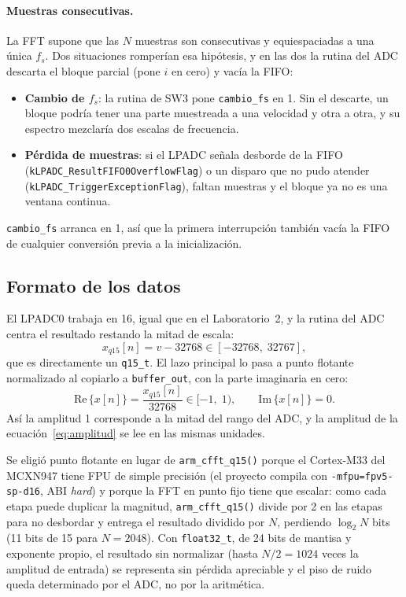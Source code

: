 \documentclass[11pt,a4paper]{article}
\begin{document}
\paragraph{Muestras consecutivas.} La FFT supone que las $N$ muestras son
consecutivas y equiespaciadas a una única $f_s$. Dos situaciones romperían
esa hipótesis, y en las dos la rutina del ADC descarta el bloque parcial
(pone $i$ en cero) y vacía la FIFO:
\begin{itemize}[nosep]
  \item \textbf{Cambio de $f_s$}: la rutina de SW3 pone \texttt{cambio\_fs}
        en 1. Sin el descarte, un bloque podría tener una parte muestreada a
        una velocidad y otra a otra, y su espectro mezclaría dos escalas de
        frecuencia.
  \item \textbf{Pérdida de muestras}: si el LPADC señala desborde de la FIFO
        (\texttt{kLPADC\_ResultFIFO0}\allowbreak\texttt{OverflowFlag}) o un disparo que no pudo
        atender (\texttt{kLPADC\_Trigger}\allowbreak\texttt{ExceptionFlag}), faltan muestras y el
        bloque ya no es una ventana continua.
\end{itemize}
\texttt{cambio\_fs} arranca en 1, así que la primera interrupción también
vacía la FIFO de cualquier conversión previa a la inicialización.

\subsection{Formato de los datos}\label{sec:formato}

El LPADC0 trabaja en \qty{16}{\bit}, igual que en el Laboratorio~2, y la
rutina del ADC centra el resultado restando la mitad de escala:
\begin{equation}
  x_{q15}[n] = v - 32768 \in [-32768,\; 32767],
\end{equation}
que es directamente un \texttt{q15\_t}. El lazo principal lo pasa a punto
flotante normalizado al copiarlo a \texttt{buffer\_out}, con la parte
imaginaria en cero:
\begin{equation}
  \mathrm{Re}\,\{x[n]\} = \frac{x_{q15}[n]}{32768} \in [-1,\; 1),
  \qquad \mathrm{Im}\,\{x[n]\} = 0.
\end{equation}
Así la amplitud 1 corresponde a la mitad del rango del ADC, y la amplitud de
la ecuación~\eqref{eq:amplitud} se lee en las mismas unidades.

Se eligió punto flotante en lugar de \texttt{arm\_cfft\_q15()} porque el
Cortex-M33 del MCXN947 tiene FPU de simple precisión (el proyecto compila
con \texttt{-mfpu=fpv5-sp-d16}, ABI \emph{hard}) y porque la FFT en punto
fijo tiene que escalar: como cada etapa puede duplicar la magnitud,
\texttt{arm\_cfft\_q15()} divide por 2 en las etapas para no desbordar y
entrega el resultado dividido por $N$, perdiendo $\log_2 N$ bits (11 bits de
15 para $N = 2048$). Con \texttt{float32\_t}, de 24 bits de mantisa y
exponente propio, el resultado sin normalizar (hasta $N/2 = 1024$ veces la
amplitud de entrada) se representa sin pérdida apreciable y el piso de ruido
queda determinado por el ADC, no por la aritmética.
\end{document}
